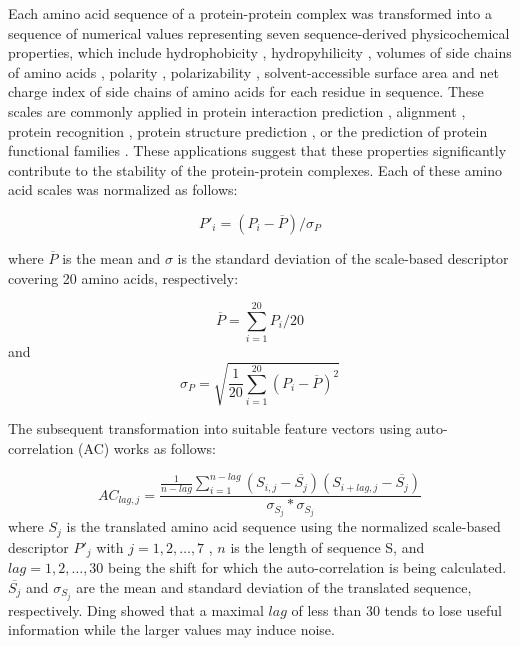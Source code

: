 \documentclass{bioinfo}
\begin{document}
Each amino acid sequence of a protein-protein complex was transformed
into a sequence of numerical values representing seven
sequence-derived physicochemical properties, which include
hydrophobicity \citep{Eisenberg:1984, Koehler:2009}, hydropyhilicity
\citep{Hopp:1981}, volumes of side chains of amino acids
\citep{Krigbaum:1979}, polarity \citep{Grantham:1974}, polarizability
\citep{Charton:1982}, solvent-accessible surface area \citep{Rose:1985}
and net charge index of side chains of amino acids \citep{Zhou:2006}
for each residue in sequence. These scales are commonly applied in
protein interaction prediction \citep{Bock:2001} \citep{Bock:2003},
alignment \citep{Stamm:2013}, protein recognition \citep{Ding:2001},
protein structure prediction \citep{Durham:2009}, or the prediction of
protein functional families \citep{Cai:2003}. These applications
suggest that these properties significantly contribute to the
stability of the protein-protein complexes. Each of these amino acid
scales was normalized as follows: 

\begin{equation}
P'_{i} = (P_i - \overline{P}) / \sigma_P
\end{equation}

where $\overline{P}$ is the mean and $\sigma$ is the standard
deviation of the scale-based descriptor covering 20 amino acids,
respectively: 

\begin{equation}
\overline{P} = \sum^{20}_{i=1}P_i / 20
\end{equation}
 and 
\begin{equation}
\sigma_P = \sqrt{\frac{1}{20} \sum^{20}_{i=1}(P_i - \overline{P})^2}
\end{equation}

The subsequent transformation into suitable feature vectors using
auto-correlation (AC) works as follows: 

\begin{equation}
AC_{lag, j} = \frac {\frac{1}{n-lag} \sum^{n-lag}_{i=1} ( S_{i,j} - \overline{S_j}) (S_{i+lag,j} - \overline{S_j})} { \sigma_{S_j} * \sigma_{S_j} }
\end{equation}
where $S_j$ is the translated amino acid sequence using the normalized
scale-based descriptor $P'_j$ with $j = 1, 2, \dots, 7$ , $n$ is the
length of sequence S, and $lag = 1, 2, \dots, 30$  being the shift for
which the auto-correlation is being calculated. $\overline{S_j}$ and
$\sigma_{S_j}$ are the mean and standard deviation of the translated
sequence, respectively. Ding \citep{Ding:2016} showed that a maximal
$lag$ of less than 30 tends to lose useful information while the
larger values may induce noise. 
\end{document}
